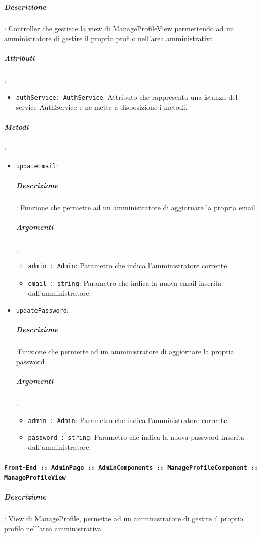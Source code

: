 \documentclass[../DefinizioneDiProdotto_v2.0.0.tex]{subfiles}
\begin{document}
					\subparagraph{Descrizione}: Controller che gestisce la view di ManageProfileView permettendo ad un amministratore di gestire il proprio profilo nell'area amministrativa
					\subparagraph{Attributi}:
					\begin{itemize}
						\item \texttt{authService: AuthService}: Attributo che rappresenta una istanza del service AuthService e ne mette a disposizione i metodi.
					\end{itemize}
					\subparagraph{Metodi}:
					\begin{itemize}
						\item \texttt{updateEmail}:
						\subparagraph{Descrizione}: Funzione che permette ad un amministratore di aggiornare la propria email
						\subparagraph{Argomenti}:
						\begin{itemize}
							\item \texttt{admin : Admin}: Parametro che indica l'amministratore corrente.
							\item \texttt{email : string}: Parametro che indica la nuova email inserita dall'amministratore.
						\end{itemize}
						\item \texttt{updatePassword}:
						\subparagraph{Descrizione}:Funzione che permette ad un amministratore di aggiornare la propria password
						\subparagraph{Argomenti}:
						\begin{itemize}
							\item \texttt{admin : Admin}: Parametro che indica l'amministratore corrente.
							\item \texttt{password : string}: Parametro che indica la nuova password inserita dall'amministratore.
						\end{itemize}
					\end{itemize}\vspace{0.5em}
				\paragraph{\texttt{Front-End :: AdminPage :: AdminComponents :: ManageProfileComponent :: ManageProfileView}}

					\subparagraph{Descrizione}: View di ManageProfile, permette ad un amministratore di gestire il proprio profilo nell'area amministrativa


	\newpage
\end{document}
